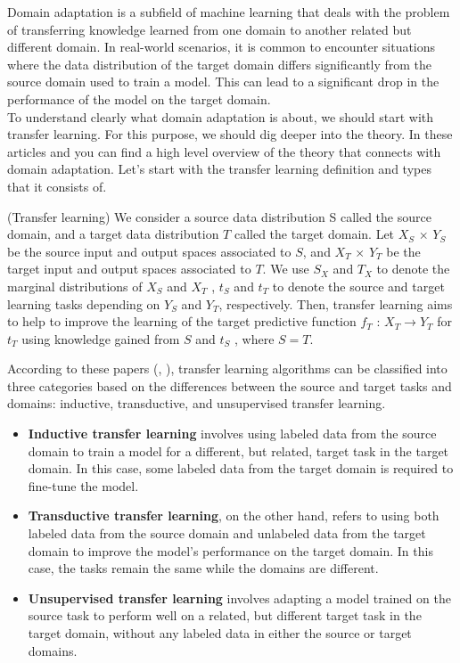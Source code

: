 
Domain adaptation is a subfield of machine learning that deals with the problem of transferring knowledge learned from one domain to another related but different domain. In real-world scenarios, it is common to encounter situations where the data distribution of the target domain differs significantly from the source domain used to train a model. This can lead to a significant drop in the performance of the model on the target domain.\\

To understand clearly what domain adaptation is about, we should start with transfer learning. For this purpose, we should dig deeper into the theory. In these articles \cite{redko2020survey} and \cite{wilson2020survey}  you can find a high level overview of the theory that connects with domain adaptation. Let's start with the transfer learning definition and types that it consists of. 

\begin{definition}
(Transfer learning) We consider a source data distribution S called the source domain, and a target
data distribution $T$ called the target domain. Let $X_S$ × $Y_S$ be the source input and output spaces associated to $S$, and $X_T$ × $Y_T$ be the target input and output spaces associated to $T$. We use $S_X$ and $T_X$ to denote the marginal distributions of $X_S$ and $X_T$ , $t_S$ and $t_T$ to denote the source and target learning tasks depending on $Y_S$ and $Y_T$, respectively. Then, transfer learning aims to help to improve the learning of the target predictive function $f_T$ : $X_T \longrightarrow Y_T$ for $t_T$ using
knowledge gained from $S$ and $t_S$ , where $S = T$.
\end{definition}

According to these papers (\cite{redko2020survey}, \cite{wilson2020survey}), transfer learning algorithms can be classified into three categories based on the differences between the source and target tasks and domains: inductive, transductive, and unsupervised transfer learning. 
\begin{itemize}
    \item \textbf{Inductive transfer learning} involves using labeled data from the source domain to train a model for a different, but related, target task in the target domain. In this case, some labeled data from the target domain is required to fine-tune the model.

    \item \textbf{Transductive transfer learning}, on the other hand, refers to using both labeled data from the source domain and unlabeled data from the target domain to improve the model's performance on the target domain. In this case, the tasks remain the same while the domains are different.

    \item \textbf{Unsupervised transfer learning} involves adapting a model trained on the source task to perform well on a related, but different target task in the target domain, without any labeled data in either the source or target domains.
\end{itemize}

